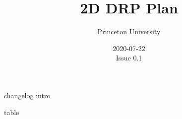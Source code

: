 \documentclass[12pt]{article}
\begin{document}
\title{2D DRP Plan}
\author{Princeton University}
 \date{2020-07-22\\Issue 0.1}
\maketitle

\tableofcontents
\newpage

%
%
{changelog}
{intro}
\footnotesize
\begin{landscape}
{table}
\end{landscape}
\normalsize

%
%
\end{document}
